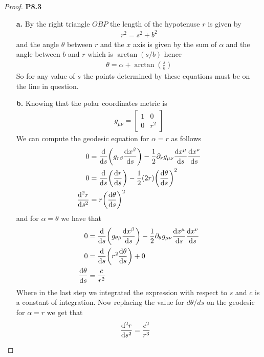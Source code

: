 \documentclass[11pt]{article}
\theoremstyle{definition}
\begin{document}
\begin{proof}{\textbf{P8.3}}
    \begin{itemize}
        \item [\textbf{a.}] By the right triangle $OBP$ the length of the
        hypotenuse $r$ is given by
        \begin{align*}
            r^2 = s^2 + b^2
        \end{align*}
        and the angle $\theta$ between $r$ and the $x$ axis is given by
        the sum of $\alpha$ and the angle between $b$ and $r$ which is 
        $\arctan(s/b)$ hence
        \begin{align*}
            \theta = \alpha + \arctan(\frac{s}{b})
        \end{align*}
        So for any value of $s$ the points determined by these equations must
        be on the line in question.
        
        \item [\textbf{b.}] Knowing that the polar coordinates metric is
        \begin{align*}
            g_{\mu\nu} = \begin{bmatrix}
                1 & 0 \\ 0 & r^2
            \end{bmatrix}
        \end{align*}
        We can compute the geodesic equation for $\alpha = r$ as follows
        \begin{align*}
            0 &= \derivative{}{s}\bigg(
            g_{r\beta}\derivative{x^\beta}{s}\bigg)
            - \frac{1}{2}\partial_r g_{\mu\nu}\derivative{x^\mu}{s}
            \derivative{x^\nu}{s}\\
            0 &= \derivative{}{s}\bigg(
            \derivative{r}{s}\bigg)
            - \frac{1}{2}(2r)\bigg(\derivative{\theta}{s}\bigg)^2\\
            \derivative[2]{r}{s} &= r\bigg(\derivative{\theta}{s}\bigg)^2
        \end{align*}
        and for $\alpha = \theta$ we have that
        \begin{align*}
            0 &= \derivative{}{s}\bigg(
            g_{\theta\beta}\derivative{x^\beta}{s}\bigg)
            - \frac{1}{2}\partial_\theta g_{\mu\nu}\derivative{x^\mu}{s}
            \derivative{x^\nu}{s}\\
            0 &= \derivative{}{s}\bigg(r^2\derivative{\theta}{s}\bigg) + 0\\
            \derivative{\theta}{s} &= \frac{c}{r^2}
        \end{align*}
        Where in the last step we integrated the expression with respect to $s$
        and $c$ is a constant of integration.
        Now replacing the value for $d\theta/ds$ on the geodesic
        for $\alpha = r$ we get that
        \begin{align*}
            \derivative[2]{r}{s} &= \frac{c^2}{r^3}
        \end{align*}


\end{itemize}
\end{proof}
\end{document}
